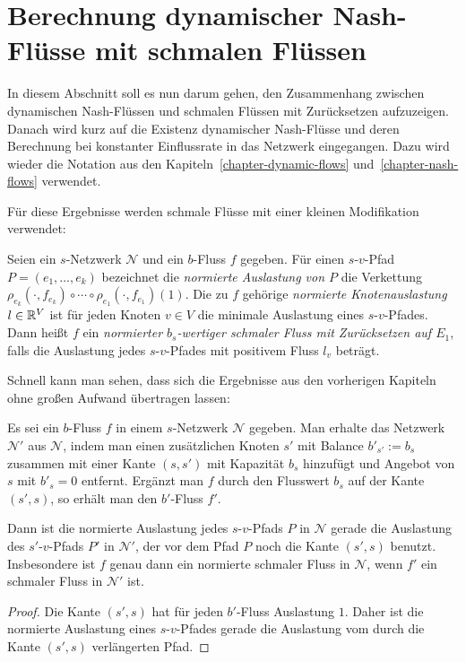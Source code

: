 \section{Berechnung dynamischer Nash-Flüsse mit schmalen Flüssen}\label{sec-nash-flow-extension}
In diesem Abschnitt soll es nun darum gehen, den Zusammenhang zwischen dynamischen Nash-Flüssen und schmalen Flüssen mit Zurücksetzen aufzuzeigen.
Danach wird kurz auf die Existenz dynamischer Nash-Flüsse und deren Berechnung bei konstanter Einflussrate in das Netzwerk eingegangen.
Dazu wird wieder die Notation aus den Kapiteln~\ref{chapter-dynamic-flows} und~\ref{chapter-nash-flows} verwendet.

Für diese Ergebnisse werden schmale Flüsse mit einer kleinen Modifikation verwendet:

\begin{definition}\label{def-normalized-thin-flow}
	Seien ein $s$-Netzwerk $\mathcal{N}$ und ein $b$-Fluss $f$ gegeben.
	Für einen $s$-$v$-Pfad $P=(e_1, \dots, e_k)$ bezeichnet die \emph{normierte Auslastung von $P$} die Verkettung $\rho_{e_k}(\cdot, f_{e_k}) \circ \cdots \circ \rho_{e_1}(\cdot, f_{e_1})(1)$.
	Die zu $f$ gehörige \emph{normierte Knotenauslastung} $l\in\mathbb{R}^V$ ist für jeden Knoten $v\in V$ die minimale Auslastung eines $s$-$v$-Pfades.
	Dann heißt $f$ ein \emph{normierter $b_s$-wertiger schmaler Fluss mit Zurücksetzen auf $E_1$}, falls die Auslastung jedes $s$-$v$-Pfades mit positivem Fluss $l_v$ beträgt.
\end{definition}

Schnell kann man sehen, dass sich die Ergebnisse aus den vorherigen Kapiteln ohne großen Aufwand übertragen lassen:

\begin{proposition}
	Es sei ein $b$-Fluss $f$ in einem $s$-Netzwerk $\mathcal{N}$ gegeben.
	Man erhalte das Netzwerk $\mathcal{N}'$ aus $\mathcal{N}$, indem man einen zusätzlichen Knoten $s'$ mit Balance $b'_{s'} := b_s$ zusammen mit einer Kante $(s, s')$ mit Kapazität $b_s$ hinzufügt und Angebot von $s$ mit $b'_s = 0$ entfernt.
	Ergänzt man $f$ durch den Flusswert $b_s$ auf der Kante $(s', s)$, so erhält man den $b'$-Fluss $f'$.
	
	Dann ist die normierte Auslastung jedes $s$-$v$-Pfads $P$ in $\mathcal{N}$ gerade die Auslastung des $s'$-$v$-Pfads $P'$ in $\mathcal{N}'$, der vor dem Pfad $P$ noch die Kante $(s', s)$ benutzt.
	Insbesondere ist $f$ genau dann ein normierte schmaler Fluss in $\mathcal{N}$, wenn $f'$ ein schmaler Fluss in $\mathcal{N'}$ ist.
\end{proposition}
\begin{proof}
	Die Kante $(s', s)$ hat für jeden $b'$-Fluss Auslastung $1$.
	Daher ist die normierte Auslastung eines $s$-$v$-Pfades gerade die  Auslastung vom durch die Kante $(s', s)$ verlängerten Pfad.
\end{proof}

